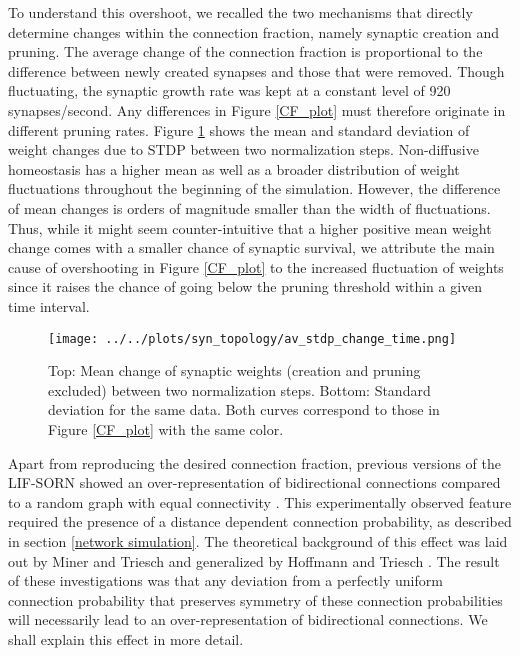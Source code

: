 \documentclass[10pt,a4paper]{article}
\begin{document}
To understand this overshoot, we recalled the two mechanisms that directly determine changes within the connection fraction, namely synaptic creation and pruning. The average change of the connection fraction is proportional to the difference between newly created synapses and those that were removed. Though fluctuating, the synaptic growth rate was kept at a constant level of 920 synapses/second. Any differences in Figure \ref{CF_plot} must therefore originate in different pruning rates. Figure \ref{STDP_change} shows the mean and standard deviation of weight changes due to STDP between two normalization steps. Non-diffusive homeostasis has a higher mean as well as a broader distribution of weight fluctuations throughout the beginning of the simulation. However, the difference of mean changes is orders of magnitude smaller than the width of fluctuations. Thus, while it might seem counter-intuitive that a higher positive mean weight change comes with a smaller chance of synaptic survival, we attribute the main cause of overshooting in Figure \ref{CF_plot} to the increased fluctuation of weights since it raises the chance of going below the pruning threshold within a given time interval.
\begin{figure}
\texttt{[image: ../../plots/syn\_topology/av\_stdp\_change\_time.png]}
\caption[Mean and standard deviation of weight changes between synaptic normalization]{Top: Mean change of synaptic weights (creation and pruning excluded) between two normalization steps. Bottom: Standard deviation for the same data. Both curves correspond to those in Figure \ref{CF_plot} with the same color.}
\label{STDP_change}
\end{figure}

Apart from reproducing the desired connection fraction, previous versions of the LIF-SORN showed an over-representation of bidirectional connections compared to a random graph with equal connectivity \cite{SORN_Paper}. This experimentally observed feature required the presence of a distance dependent connection probability, as described in section \ref{network simulation}. The theoretical background of this effect was laid out by Miner and Triesch \cite{SORN_Paper} and generalized by Hoffmann and Triesch \cite{Hoffmann_2017}. The result of these investigations was that any deviation from a perfectly uniform connection probability that preserves symmetry of these connection probabilities will necessarily lead to an over-representation of bidirectional connections. We shall explain this effect in more detail.
\end{document}
